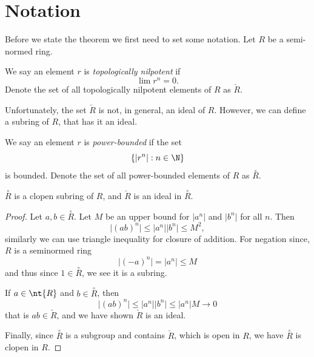 \newcommand{\pb}[1]{\overset{\circ}{#1}}
\newcommand{\tn}[1]{\check{#1}}
\newcommand{\res}[1]{\widetilde{#1}}
\newcommand{\quot}[2]{{\raisebox{.2em}{$#1$}\left/\raisebox{-.2em}{$#2$}\right.}}

\section{Notation}

Before we state the theorem we first need to set some notation. Let $R$ be a semi-normed ring.

\begin{definition}
  We say an element $r$ is \emph{topologically nilpotent} if
    \[
     \lim r^n = 0.
    \]
    Denote the set of all topologically nilpotent elements of $R$ as $\tn{R}$.
\end{definition}

Unfortunately, the set $\tn{R}$ is not, in general, an ideal of $R$. However, we can define a
subring of $R$, that has it an ideal.

\begin{definition}
  We say an element $r$ is \emph{power-bounded} if the set
  \[
  \left\{ \lvert r^n \rvert : n \in \N \right\}
  \]
  is bounded.
  Denote the set of all power-bounded elements of $R$ as $\pb{R}$.
\end{definition}

\begin{lemma}
  $\pb{R}$ is a clopen subring of $R$, and $\tn{R}$ is an ideal in $\pb{R}$.
\end{lemma}

\begin{proof}
  Let $a, b \in \pb{R}$. Let $M$ be an upper bound for $\lvert a^n \rvert$ and $\lvert b^n \rvert$
  for all $n$. Then
  \[
  \lvert (a b )^n \rvert \leq \lvert a^n \rvert \lvert b^n \rvert \leq M^2,
  \]
  similarly we can use triangle inequality for closure of addition.
  For negation since, $R$ is a seminormed ring
  \[
  \lvert (- a)^n \rvert = \lvert a^n \rvert \leq M
  \]
  and thus since $1 \in \pb{R}$, we see it is a subring.

  If $a \in \nt{R}$ and $b \in \pb{R}$, then
  \[
  \lvert (a b)^n \rvert \leq \lvert a^n \rvert \lvert b^n \rvert \leq \lvert a^n \rvert M \to 0
  \]
  that is $ a b \in \tn{R}$, and we have shown $\tn{R}$ is an ideal.

  Finally, since $\pb{R}$ is a subgroup and contains $\tn{R}$, which is open in $R$, we have $\pb{R}$
  is clopen in $R$.
\end{proof}

